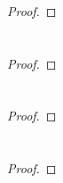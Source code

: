 \documentclass[
  coursecode={MTHE 418},
  assignmentname={Homework \homeworknumber},
  studentnumber=20053722,
  name={Bryan Hoang},
  draft,
]{
  ltxanswer%
}
\begin{document}
  \begin{questions}
    \setcounter{question}{\questionnumber}
    \addtocounter{question}{-1}
    \question[10]\
    \begin{parts}
      \part{}
      \begin{solution}
        \begin{proof}
        \end{proof}
      \end{solution}

      \part{}
      \begin{solution}
        \begin{proof}
        \end{proof}
      \end{solution}

      \part{}
      \begin{solution}
        \begin{proof}
        \end{proof}
      \end{solution}

      \part{}
      \begin{solution}
        \begin{proof}
        \end{proof}
      \end{solution}
    \end{parts}
  \end{questions}
\end{document}
